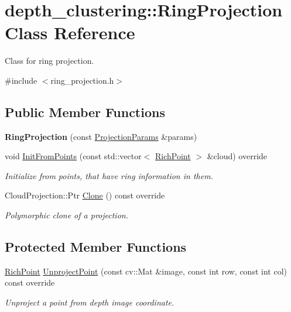 \hypertarget{classdepth__clustering_1_1RingProjection}{\section{depth\-\_\-clustering\-:\-:Ring\-Projection Class Reference}
\label{classdepth__clustering_1_1RingProjection}
}


Class for ring projection.  




{\ttfamily \#include $<$ring\-\_\-projection.\-h$>$}

\subsection*{Public Member Functions}
\begin{DoxyCompactItemize}
\item 
\hypertarget{classdepth__clustering_1_1RingProjection_a112958f27f57bd68a76a96fe02914d50}{{\bfseries Ring\-Projection} (const \hyperlink{classdepth__clustering_1_1ProjectionParams}{Projection\-Params} \&params)}\label{classdepth__clustering_1_1RingProjection_a112958f27f57bd68a76a96fe02914d50}

\item 
void \hyperlink{classdepth__clustering_1_1RingProjection_af2984815f24bc0a8c131c233d319268c}{Init\-From\-Points} (const std\-::vector$<$ \hyperlink{classdepth__clustering_1_1RichPoint}{Rich\-Point} $>$ \&cloud) override
\begin{DoxyCompactList}\small\item\em Initialize from points, that have ring information in them. \end{DoxyCompactList}\item 
Cloud\-Projection\-::\-Ptr \hyperlink{classdepth__clustering_1_1RingProjection_a433c0ee114b89b6c78ad4c471d120153}{Clone} () const override
\begin{DoxyCompactList}\small\item\em Polymorphic clone of a projection. \end{DoxyCompactList}\end{DoxyCompactItemize}
\subsection*{Protected Member Functions}
\begin{DoxyCompactItemize}
\item 
\hyperlink{classdepth__clustering_1_1RichPoint}{Rich\-Point} \hyperlink{classdepth__clustering_1_1RingProjection_a16cbf43e541e65560cb282c560b4efa7}{Unproject\-Point} (const cv\-::\-Mat \&image, const int row, const int col) const override
\begin{DoxyCompactList}\small\item\em Unproject a point from depth image coordinate. \end{DoxyCompactList}\end{DoxyCompactItemize}
